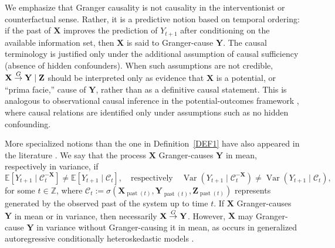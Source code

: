\documentclass[a4paper,11pt]{article}
\newcommand{\toverset}[2]{\overset{{\rm #1}}{#2}}
\DeclareMathOperator{\past}{past}
\begin{document}
We emphasize that Granger causality is not causality in the interventionist or counterfactual sense. Rather, it is a predictive notion based on temporal ordering: if the past of \(\mathbf X\) improves the prediction of \(Y_{t+1}\) after conditioning on the available information set, then \(\mathbf X\) is said to Granger-cause \(\mathbf Y\). The causal terminology is justified only under the additional assumption of causal sufficiency (absence of hidden confounders). When such assumptions are not credible, \(\mathbf X\toverset{G}{\to}\mathbf Y\mid\mathbf Z\) should be interpreted only as evidence that \(\mathbf X\) is a potential, or ``prima facie,'' cause of \(\mathbf Y\), rather than as a definitive causal statement. This is analogous to observational causal inference in the potential-outcomes framework \citep{Rubin}, where causal relations are identified only under assumptions such as no hidden confounding.


More specialized notions than the one in Definition~\ref{DEF1} have also appeared in the literature \citep{CausalityInVariance}. We say that the process \(\mathbf X\) Granger-causes \(\mathbf Y\) in mean, respectively in variance, if
\begin{equation*}
    \mathbb{E}\left[Y_{t+1}\mid \mathcal{C}^{-\mathbf X}_{t}\right]
    \neq
    \mathbb{E}\left[Y_{t+1}\mid \mathcal{C}_{t}\right],
    \quad\text{respectively}\quad
    \operatorname{Var}\!\left(Y_{t+1}\mid \mathcal{C}^{-\mathbf X}_{t}\right)
    \neq
    \operatorname{Var}\!\left(Y_{t+1}\mid \mathcal{C}_{t}\right),
\end{equation*}
for some \(t\in\mathbb Z\), where \(\mathcal C_t:=\sigma(\mathbf X_{\past(t)},\mathbf Y_{\past(t)},\mathbf Z_{\past(t)})\) represents generated by the observed past of the system up to time $t$. If \(\mathbf X\) Granger-causes \(\mathbf Y\) in mean or in variance, then necessarily \(\mathbf X\toverset{G}{\to}\mathbf Y\). However, \(\mathbf X\) may Granger-cause \(\mathbf Y\) in variance without Granger-causing it in mean, as occurs in generalized autoregressive conditionally heteroskedastic models \citep[GARCH,][]{CausalityInVariance}.
\end{document}
